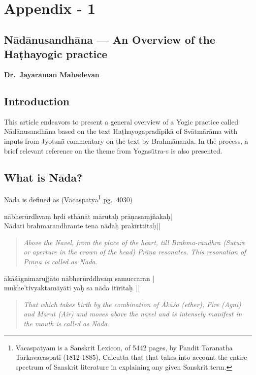 \chapter{Appendix - 1}

\section*{Nādānusandhāna --- An Overview of the Haṭhayogic practice}

\centerline{\textbf{Dr.~Jayaraman Mahadevan}}

\section*{Introduction}

This article endeavors to present a general overview of a Yogic practice called Nādānusandhāna based on the text Haṭhayogapradīpikā of Svātmārāma with inputs from Jyotsnā commentary on the text by Brahmānanda. In the process, a brief relevant reference on the theme from Yogasūtra-s is also presented.

\section*{What is Nāda?}

Nāda is defined as (Vācaspatya\footnote{Vacaspatyam is a Sanskrit Lexicon, of 5442 pages, by Pandit Taranatha Tarkavacaspati (1812-1885), Calcutta that that takes into account the entire spectrum of Sanskrit literature in explaining any given Sanskrit term.} pg.~4030)

\begin{shloka}
nābherūrdhvaṃ hṛdi sthānāt mārutaḥ prāṇasaṃjñakaḥ|\\
Nādati brahmarandhrante tena nādaḥ prakīrttitaḥ||
\end{shloka}

\begin{quote}
\textit{Above the Navel, from the place of the heart, till Brahma-randhra (Suture or aperture in the crown of the head) Prāṇa resonates. This resonation of Prāṇa is called as Nāda.}
\end{quote}

\begin{shloka}
ākāśāgnimarujjāto nābherūrddhvaṃ samuccaran |\\
mukhe'tivyaktamāyāti yaḥ sa nāda itīritaḥ ||
\end{shloka}

\begin{quote}
\textit{That which takes birth by the combination of Ākāśa (ether), Fire (Agni) and  Marut (Air) and moves above the navel and is intensely manifest in the mouth is called as Nāda.}
\end{quote}

